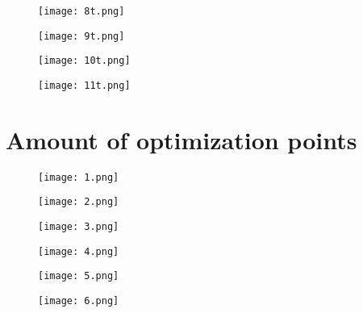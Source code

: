 \begin{figure}[h!]
	\centering
	\texttt{[image: 8t.png]}
	\label{fig:lat_acc_val}
\end{figure}


\begin{figure}[h!]
	\centering
	\texttt{[image: 9t.png]}
	\label{fig:lat_acc_val}
\end{figure}


\begin{figure}[h!]
	\centering
	\texttt{[image: 10t.png]}
	\label{fig:lat_acc_val}
\end{figure}


\begin{figure}[h!]
	\centering
	\texttt{[image: 11t.png]}
	\label{fig:lat_acc_val}
\end{figure}


\clearpage

\section{Amount of optimization points}

 \begin{figure}[h!]
	\centering
	\texttt{[image: 1.png]}
	\label{fig:lat_acc_val}
\end{figure}


\begin{figure}[h!]
	\centering
	\texttt{[image: 2.png]}
	\label{fig:lat_acc_val}
\end{figure}

\begin{figure}[h!]
	\centering
	\texttt{[image: 3.png]}
	\label{fig:lat_acc_val}
\end{figure}


\begin{figure}[h!]
	\centering
	\texttt{[image: 4.png]}
	\label{fig:lat_acc_val}
\end{figure}


\begin{figure}[h!]
	\centering
	\texttt{[image: 5.png]}
	\label{fig:lat_acc_val}
\end{figure}


\begin{figure}[h!]
	\centering
	\texttt{[image: 6.png]}
	\label{fig:lat_acc_val}
\end{figure}


